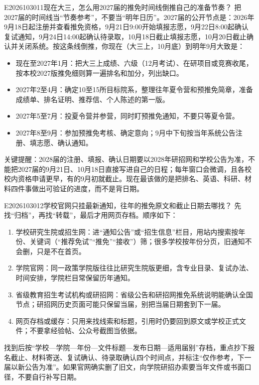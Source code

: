 \begin{qa}{E2026103011}{现在大三，怎么用2027届的推免时间线倒推自己的准备节奏？}
把2027届的时间线当“节奏参考”，不要当“明年日历”。2027届的公开节点是：2026年9月18日起注册并查看推免资格，9月21日9:00开始填报志愿，9月22日8:00起确认复试通知，9月24日14:00起确认待录取，10月18日截止填报志愿，10月20日截止确认并关闭系统。按这条线倒推，你现在（大三上，10月底）到明年9月大致是：

\begin{itemize}
  \item 现在至2027年1月：把大三上成绩、六级（12月考试）、在研项目或竞赛收尾，按本校2027版推免细则算一遍排名和加分，列出缺口。
  \item 2027年2至4月：确定10至15所目标院系，整理往年夏令营和预推免简章，准备成绩单、排名证明、推荐信、个人陈述的第一版。
  \item 2027年5至7月：投夏令营并参营，同时盯预推免通知，不要只等夏令营。
  \item 2027年8至9月：参加预推免考核、确定意向；9月中下旬按当年系统公告注册、填志愿、确认通知。
\end{itemize}

关键提醒：2028届的注册、填报、确认日期要以2028年研招网和学校公告为准，不能把2027届的9月21日、10月18日直接写进自己的日程；每年窗口会微调，且各校校内资格申请更早，有的9月初就截止。现在最该做的是把排名、英语、科研、材料四件事做出可验证的进度，而不是背日期。
\end{qa}

\begin{qa}{E2026103012}{学校官网只挂最新通知，往年的推免原文和截止日期去哪找？}
先找“归档”，再找“转载”，最后才用网页存档。顺序如下：

\begin{enumerate}
  \item 学校研究生院或招生网：进“通知公告”或“招生信息”栏目，用站内搜索按年份、关键词（“推荐免试”“推免”“接收”）筛；很多学校按年份分页，旧通知不会删，只是不在首页。
  \item 学院官网：同一政策学院版往往比研究生院版更细，含专业目录、复试办法、时间安排，学院栏目常保留历年通知。
  \item 省级教育招生考试机构或研招网：省级公告和研招网推免系统说明能确认全国节点；研招网历史页面可能只保留当届，别把当届日期套到下一届。
  \item 网页存档或缓存：只用来找线索和标题，引用时仍要回到原文或学校正式文件；不要拿经验帖、公众号截图当依据。
\end{enumerate}

找到后按“学校—学院—年份—文件标题—发布日期—适用届别”存档，重点抄下报名截止、材料寄送、复试确认、待录取确认四个时间点，并标注“仅作参考，下一届以新公告为准”。如果官网确实删了旧文，向学院研招办索要当年文件或书面口径，不要自行补写日期。
\end{qa}

